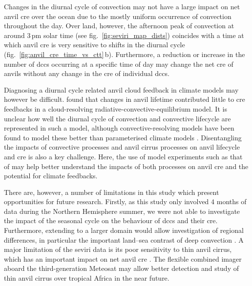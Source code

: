 Changes in the diurnal cycle of convection may not have a large impact on net anvil \acrshort{cre} over the ocean due to the mostly uniform occurrence of convection throughout the day.
Over land, however, the afternoon peak of convection at around 3\,pm solar time (see fig.~\ref{fig:seviri_map_dists}) coincides with a time at which anvil \acrshort{cre} is very sensitive to shifts in the diurnal cycle (fig.~\ref{fig:anvil_cre_time_vs_ctt}\,b).
Furthermore, a reduction or increase in the number of \acrshort{dcc}s occurring at a specific time of day may change the net \acrshort{cre} of anvils without any change in the \acrshort{cre} of individual \acrshort{dcc}s.

Diagnosing a diurnal cycle related anvil cloud feedback in climate models may however be difficult.
\citet{beydoun_dissecting_2021} found that changes in anvil lifetime contributed little to \acrshort{cre} feedbacks in a cloud-resolving radiative-convective-equilibrium model.
It is unclear how well the diurnal cycle of convection and convective lifecycle are represented in such a model, although convective-resolving models have been found to model these better than parameterised climate models \citep{prein_review_2015, feng_mesoscale_2023}.
Disentangling the impacts of convective processes and anvil cirrus processes on anvil lifecycle and \acrshort{cre} is also a key challenge.
Here, the use of model experiments such as that of \citet{gasparini_diurnal_2022} may help better understand the impacts of both processes on anvil \acrfull{cre} and the potential for climate feedbacks.

There are, however, a number of limitations in this study which present opportunities for future research. 
Firstly, as this study only involved 4 months of data during the Northern Hemisphere summer, we were not able to investigate the impact of the seasonal cycle on the behaviour of \acrshort{dcc}s and their \acrshort{cre}. 
Furthermore, extending to a larger domain would allow investigation of regional differences, in particular the important land--sea contrast of deep convection \citep{takahashi_revisiting_2023}. 
A major limitation of the \acrshort{seviri} data is its poor sensitivity to thin anvil cirrus, which has an important impact on net anvil \acrshort{cre} \citep{protopapadaki_upper_2017, horner_evolution_2023}.
The flexible combined imager \citep{martin_fci_2021} aboard the third-generation Meteosat may allow better detection and study of thin anvil cirrus over tropical Africa in the near future.


